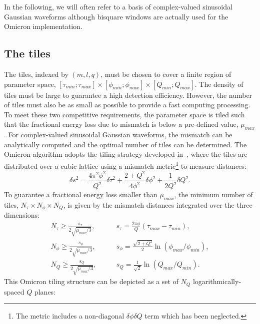 In the following, we will often refer to a basis of complex-valued sinusoidal Gaussian waveforms although bisquare windows are actually used for the Omicron implementation.


\subsection{The tiles} \label{sec:analysis:tiles}
The tiles, indexed by $(m,l,q)$, must be chosen to cover a finite region of parameter space, $[\tau_{min};\tau_{max}]\times [\phi_{min};\phi_{max}] \times [Q_{min};Q_{max}]$. The density of tiles must be large to guarantee a high detection efficiency. However, the number of tiles must also be as small as possible to provide a fast computing processing. To meet these two competitive requirements, the parameter space is tiled such that the fractional energy loss due to mismatch is below a pre-defined value, $\mu_{max}$. For complex-valued sinusoidal Gaussian waveforms, the mismatch can be analytically computed and the optimal number of tiles can be determined. The Omicron algorithm adopts the tiling strategy developed in~\cite{Chatterji:2004}, where the tiles are distributed over a cubic lattice using a mismatch metric\footnote{The metric includes a non-diagonal $\delta \phi \delta Q$ term which has been neglected.} to measure distances:
\begin{equation}
  \delta s^2 =
  \frac{4\pi^2\phi^2}{Q^2}\delta \tau^2
  + \frac{2+Q^2}{4\phi^2}\delta \phi^2
  + \frac{1}{2Q^2}\delta Q^2.
  \label{eq:tilemetric}
\end{equation}
To guarantee a fractional energy loss smaller than $\mu_{max}$, the minimum number of tiles, $N_\tau \times N_\phi \times N_Q$, is given by the mismatch distances integrated over the three dimensions:
\begin{align}
  N_\tau \ge \frac{s_\tau}{2\sqrt{\mu_{max}/3}},  & \qquad s_\tau = \frac{2\pi\phi}{Q}(\tau_{max} - \tau_{min}), \label{eq:tiledistancetau} \\
  N_\phi \ge \frac{s_\phi}{2\sqrt{\mu_{max}/3}},  & \qquad s_\phi = \frac{\sqrt{2+Q^2}}{2}\ln(\phi_{max}/\phi_{min}), \label{eq:tiledistancephi} \\
  N_Q \ge \frac{s_Q}{2\sqrt{\mu_{max}/3}},  & \qquad s_Q = \frac{1}{\sqrt{2}}\ln(Q_{max}/Q_{min}). \label{eq:tiledistanceq}
\end{align}
This Omicron tiling structure can be depicted as a set of $N_Q$ logarithmically-spaced $Q$ planes:
